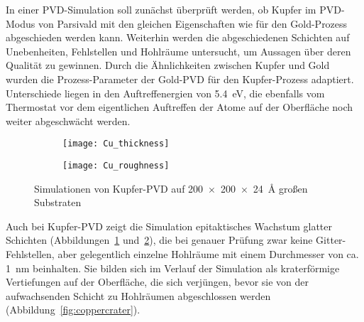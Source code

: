 In einer PVD-Simulation soll zunächst überprüft werden, ob Kupfer im PVD-Modus von Parsivald mit den gleichen Eigenschaften wie für den Gold-Prozess abgeschieden werden kann.
Weiterhin werden die abgeschiedenen Schichten auf Unebenheiten, Fehlstellen und Hohlräume untersucht, um Aussagen über deren Qualität zu gewinnen.
Durch die Ähnlichkeiten zwischen Kupfer und Gold wurden die Prozess-Parameter der Gold-PVD für den Kupfer-Prozess adaptiert.
Unterschiede liegen in den Auftreffenergien von \SI{5.4}{\electronvolt}, die ebenfalls vom Thermostat vor dem eigentlichen Auftreffen der Atome auf der Oberfläche noch weiter abgeschwächt werden.

\begin{figure}[b!]
  \captionsetup[subfigure]{singlelinecheck=false}
  \def\subfigwidth{0.49\textwidth}
  \begin{subfigure}[t]{\subfigwidth}
    \texttt{[image: Cu\_thickness]}
    \label{fig:copperparsivald-a}
  \end{subfigure}
  \hfill
  \begin{subfigure}[t]{\subfigwidth}
    \texttt{[image: Cu\_roughness]}
    \label{fig:copperparsivald-b}
  \end{subfigure}
  \caption{Simulationen von Kupfer-PVD auf \SI{200x200x24}{\angstrom} großen Substraten}
  \label{fig:copperparsivald}
\end{figure}

Auch bei Kupfer-PVD zeigt die Simulation epitaktisches Wachstum glatter Schichten (Abbildungen~\ref{fig:copperparsivald-a} und~\ref{fig:copperparsivald-b}), die bei genauer Prüfung zwar keine Gitter-Fehlstellen, aber gelegentlich einzelne Hohlräume mit einem Durchmesser von ca. \SI{1}{\nano\meter} beinhalten.
Sie bilden sich im Verlauf der Simulation als kraterförmige Vertiefungen auf der Oberfläche, die sich verjüngen, bevor sie von der aufwachsenden Schicht zu Hohlräumen abgeschlossen werden (Abbildung~\ref{fig:coppercrater}).

